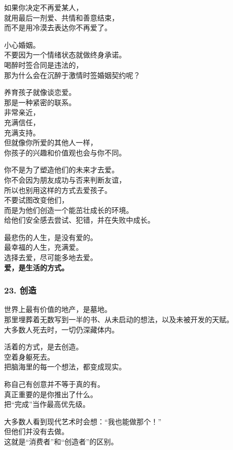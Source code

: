 \documentclass[
]{article}
\begin{document}
如果你决定不再爱某人，\\
就用最后一剂爱、共情和善意结束，\\
而不是用冷漠去表达你不再爱了。

小心婚姻。\\
不要因为一个情绪状态就做终身承诺。\\
喝醉时签合同是违法的，\\
那为什么会在沉醉于激情时签婚姻契约呢？

养育孩子就像谈恋爱。\\
那是一种紧密的联系。\\
非常亲近，\\
充满信任，\\
充满支持。\\
但就像你所爱的其他人一样，\\
你孩子的兴趣和价值观也会与你不同。

你不是为了塑造他们的未来才去爱。\\
你不会因为朋友成功与否来判断友谊，\\
所以也别用这样的方式去爱孩子。\\
不要试图改变他们，\\
而是为他们创造一个能茁壮成长的环境。\\
给他们安全感去尝试、犯错，并在失败中成长。

最悲伤的人生，是没有爱的。\\
最幸福的人生，充满爱。\\
选择去爱，尽可能多地去爱。\\
\textbf{爱，是生活的方式。}

\subsubsection{23. 创造}\label{23-ux521bux9020}

世界上最有价值的地产，是墓地。\\
那里埋葬着无数写到一半的书、从未启动的想法，以及未被开发的天赋。\\
大多数人死去时，一切仍深藏体内。

活着的方式，是去创造。\\
空着身躯死去。\\
把脑海里的每一个想法，都变成现实。

称自己有创意并不等于真的有。\\
真正重要的是你推出了什么。\\
把``完成''当作最高优先级。

大多数人看到现代艺术时会想：``我也能做那个！''\\
但他们并没有去做。\\
这就是``消费者''和``创造者''的区别。
\end{document}
